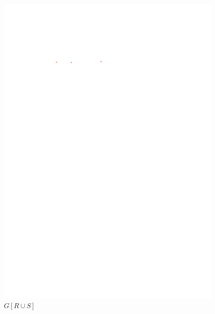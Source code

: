 \documentclass[12pt]{article}
\theoremstyle{definition}
\begin{document}
\begin{figure}
  \centering
  \includegraphics[page=2,trim={0 28 0 23},clip]{figs/bg_layers.pdf} \\[0ex]
  $G[R\cup S]$ \\[2ex]

\end{figure}
\end{document}
